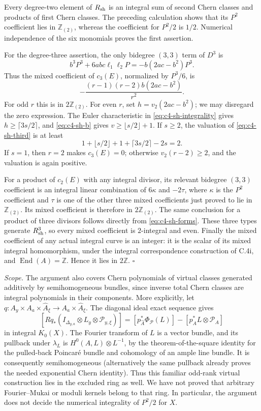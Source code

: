Every degree-two element of $R_{\rm sh}$ is an integral sum of second
Chern classes and products of first Chern classes. The preceding
calculation shows that its $P^2$ coefficient lies in
$\mathbb Z_{(2)}$, whereas the coefficient for $P^2/2$ is $1/2$.
Numerical independence of the six monomials proves the first assertion.

For the degree-three assertion, the only bidegree $(3,3)$ term of
$D^3$ is
\[
 b^3P^3+6abc\ell_1\ell_2P
       =-b(2ac-b^2)P^3.
\]
Thus the mixed coefficient of $c_3(E)$, normalized by $P^3/6$, is
\begin{equation}\label{eq:c4-sh-third}
                  -\frac{(r-1)(r-2)b(2ac-b^2)}{r^2}.
\end{equation}
For odd $r$ this is in $2\mathbb Z_{(2)}$. For even $r$, set
$h=v_2(2ac-b^2)$; we may disregard the zero expression. The Euler
characteristic in \eqref{eq:c4-sh-integrality} gives
$h\ge\lceil3s/2\rceil$, and \eqref{eq:c4-sh-b} gives
$v\ge\lfloor s/2\rfloor+1$. If $s\ge2$, the valuation of
\eqref{eq:c4-sh-third} is at least
\[
 1+\lfloor s/2\rfloor+1+\lceil3s/2\rceil-2s=2.
\]
If $s=1$, then $r=2$ makes $c_3(E)=0$; otherwise
$v_2(r-2)\ge2$, and the valuation is again positive.

For a product of $c_2(E)$ with any integral divisor, its relevant
bidegree $(3,3)$ coefficient is an integral linear combination of
$6\kappa$ and $-2\tau$, where $\kappa$ is the $P^2$ coefficient and
$\tau$ is one of the other three mixed coefficients just proved to
lie in $\mathbb Z_{(2)}$. Its mixed coefficient is therefore in
$2\mathbb Z_{(2)}$. The same conclusion for a product of three
divisors follows directly from \eqref{eq:c4-sh-forms}. These three
types generate $R_{\rm sh}^{3}$, so every mixed coefficient is
$2$-integral and even. Finally the mixed coefficient of any actual
integral curve is an integer: it is the scalar of its mixed integral
homomorphism, under the integral correspondence construction of C.4i,
and $\operatorname{End}(A)=\mathbb Z$. Hence it lies in $2\mathbb Z$.
\hfill$\square$

\emph{Scope.}
The argument also covers Chern polynomials of virtual classes generated
additively by semihomogeneous bundles, since inverse total Chern classes
are integral polynomials in their components. More explicitly, let
$q:A_y\times A_a\times\widehat A_\xi\to A_a\times\widehat A_\xi$.
The diagonal ideal exact sequence gives
\[
 [Rq_*(I_{\Delta_{y,a}}\otimes L_y\otimes\mathcal P_{y,\xi})]
  =[p_{\widehat A}^*\Phi_{\mathcal P}(L)]
       -[p_A^*L\otimes\mathcal P_A]
\]
in integral $K_0(X)$. The Fourier transform of $L$ is a vector bundle,
and its pullback under $\lambda_L$ is
$H^0(A,L)\otimes L^{-1}$, by the theorem-of-the-square identity for
the pulled-back Poincar\'e bundle and cohomology of an ample line
bundle. It is consequently semihomogeneous (alternatively the same
pullback already proves the needed exponential Chern identity).
Thus this familiar odd-rank virtual construction lies in the excluded
ring as well. We have not proved that arbitrary Fourier--Mukai or
moduli kernels belong to that ring. In particular, the argument does
not decide the numerical integrality of $P^2/2$ for $X$.
